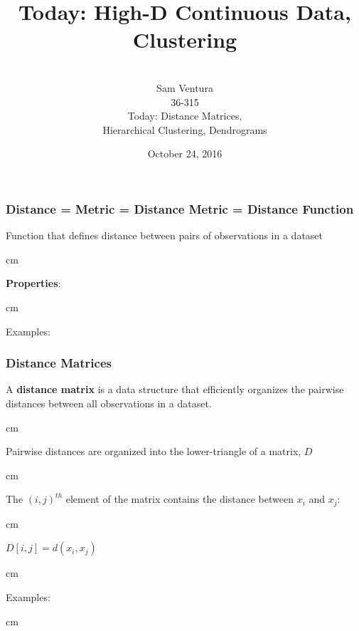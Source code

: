 \documentclass{beamer} %
\begin{document}
\title[dedup]{Today:  High-D Continuous Data, Clustering}


\author[Samuel L. Ventura]{\\
  \large{Sam Ventura\\36-315\\Today:  Distance Matrices, \\Hierarchical Clustering, Dendrograms}}
\date{October 24, 2016}


\begin{frame}
	\maketitle

	
\end{frame}



\begin{frame}\frametitle{Distance = Metric = Distance Metric = Distance Function}
	\small
	
	Function that defines distance between pairs of observations in a dataset
	
	 cm
	
	\textbf{Properties}:
	
	 cm
	
	Examples:  
	
\end{frame}


\begin{frame}\frametitle{Distance Matrices}
	\small
	
	A \textbf{distance matrix} is a data structure that efficiently organizes the pairwise distances between all observations in a dataset.
	
	 cm
	
	Pairwise distances are organized into the lower-triangle of a matrix, $D$
	
	 cm
	
	The $(i,j)^{th}$ element of the matrix contains the distance between $x_i$ and $x_j$:
	
	 cm
	
	$D[i,j] = d(x_i, x_j)$
	
	 cm
	
	Examples:
	
	
	
	 cm
	
	

	
\end{frame}
\end{document}

